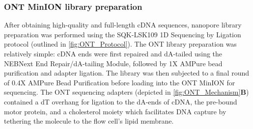 \subsubsection{ONT MinION library preparation}
\label{sec: ONTlib_preparation}
After obtaining high-quality and full-length cDNA sequences, nanopore library preparation was performed using the SQK-LSK109 1D Sequencing by Ligation protocol (outlined in \cref{fig:ONT_Protocol}). The ONT library preparation was relatively simple: cDNA ends were first repaired and dA-tailed using the NEBNext End Repair/dA-tailing Module, followed by 1X AMPure bead purification and adapter ligation. The library was then subjected to a final round of 0.4X AMPure Bead Purification before loading into the ONT MinION for sequencing. The ONT sequencing adapters (depicted in \cref{fig:ONT_Mechanism}\textbf{B}) contained a dT overhang for ligation to the dA-ends of cDNA, the pre-bound motor protein, and a cholesterol moiety which facilitates DNA capture by tethering the molecule to the flow cell's lipid membrane.

